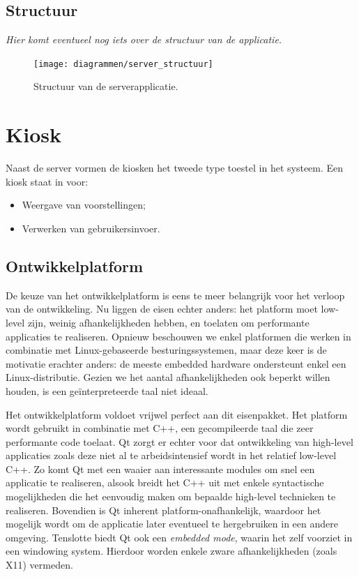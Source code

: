 \subsection{Structuur}

\textit{Hier komt eventueel nog iets over de structuur van de applicatie.}

\begin{figure}
	\texttt{[image: diagrammen/server\_structuur]}
	\caption{Structuur van de serverapplicatie.}
\end{figure}

\section{Kiosk}
\label{ontwerp:applicatie:kiosk}

Naast de server vormen de kiosken het tweede type toestel in het systeem. Een kiosk staat in voor:
\begin{itemize}
\item Weergave van voorstellingen;
\item Verwerken van gebruikersinvoer.
\end{itemize}

\subsection{Ontwikkelplatform}

De keuze van het ontwikkelplatform is eens te meer belangrijk voor het verloop van de ontwikkeling. Nu liggen de eisen echter anders: het platform moet low-level zijn, weinig afhankelijkheden hebben, en toelaten om performante applicaties te realiseren. Opnieuw beschouwen we enkel platformen die werken in combinatie met Linux-gebaseerde besturingssystemen, maar deze keer is de motivatie erachter anders: de meeste embedded hardware ondersteunt enkel een Linux-distributie. Gezien we het aantal afhankelijkheden ook beperkt willen houden, is een geïnterpreteerde taal niet ideaal.

Het ontwikkelplatform  voldoet vrijwel perfect aan dit eisenpakket. Het platform wordt gebruikt in combinatie met C++, een gecompileerde taal die zeer performante code toelaat. Qt zorgt er echter voor dat ontwikkeling van high-level applicaties zoals deze niet al te arbeidsintensief wordt in het relatief low-level C++. Zo komt Qt met een waaier aan interessante modules om snel een applicatie te realiseren, alsook breidt het C++ uit met enkele syntactische mogelijkheden die het eenvoudig maken om bepaalde high-level technieken te realiseren. Bovendien is Qt inherent platform-onafhankelijk, waardoor het mogelijk wordt om de applicatie later eventueel te hergebruiken in een andere omgeving. Tenslotte biedt Qt ook een \emph{embedded mode}, waarin het zelf voorziet in een windowing system. Hierdoor worden enkele zware afhankelijkheden (zoals X11) vermeden.

